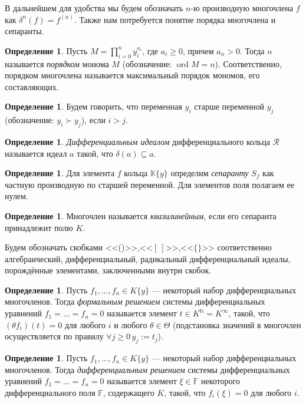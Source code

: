 \documentclass[16pt]{article}
\DeclareMathOperator{\ord}{ord}
\renewcommand{\ge}{\geqslant} %
\theoremstyle{plain1}
\theoremstyle{plain2}
\theoremstyle{plain}
\theoremstyle{plain3}
\theoremstyle{definition}
\newtheorem{definition}[theorem2]{Определение}
\theoremstyle{remark}
\begin{document}
В дальнейшем для удобства мы будем обозначать $n$-ю производную многочлена $f$ как $\delta^n(f)=f^{(n)}$. Также нам потребуется понятие порядка многочлена и сепаранты.
\begin{definition}
Пусть $M = \prod\limits_{i=0}^ny_i^{a_i}$, где $a_i \geqslant 0$, причем $a_n > 0$. Тогда $n$ называется \emph{порядком} монома $M$ (обозначение: $\ord M=n$). Соответственно, порядком многочлена называется максимальный порядок
мономов, его составляющих.
\end{definition}
\begin{definition}
Будем говорить, что переменная $y_i$ старше переменной $y_j$ (обозначение: $y_i \succ y_j$), если $i>j$.
\end{definition}
\begin{definition}
\emph{Дифференциальным идеалом} дифференциального кольца $\mathcal{R}$ называется идеал $a$ такой, что $\delta(a)\subseteq a$.
\end{definition}


\begin{definition}
Для элемента $f$ кольца $\mathbb{K}\{y\}$ определим \emph{сепаранту} $S_f$
как частную производную по старшей переменной. Для элементов поля полагаем ее нулем.
\end{definition}

\begin{definition} Многочлен называется \emph{квазилинейным}, если
его сепаранта принадлежит полю $K$.
\end{definition}



Будем обозначать скобками <<()>>,<<$[~]$>>,<<$\{\}$>> соответственно
алгебраический, дифференциальный, радикальный дифференциальный
идеалы, порождённые элементами, заключенными внутри скобок.


\begin{definition}
Пусть $f_1,\ldots,f_n\in K\{y\}$ --- некоторый набор
дифференциальных многочленов. Тогда \emph{формальным решением}
системы дифференциальных уравнений $f_1=\ldots =f_n=0$ называется
элемент $t\in K^{\mathbb{N}}= K^{\infty}$, такой, что $ (\theta f_i)(t)=0$ для
любого $i$ и любого $\theta\in\Theta$ (подстановка значений в
многочлен осуществляется по правилу $\forall j\ge 0 \, y_j:=t_j$).
\end{definition}




\begin{definition}
Пусть $f_1,\ldots,f_n\in K\{y\}$ --- некоторый
набор дифференциальных многочленов. Тогда \emph{дифференциальным
решением} системы дифференциальных уравнений $f_1=\ldots =f_n=0$
называется элемент $\xi \in \mathbb{F}$ некоторого дифференциального
поля $\mathbb{F}$, содержащего $K$, такой, что $ f_i(\xi)=0$ для
любого $i$.
\end{definition}
\end{document}
